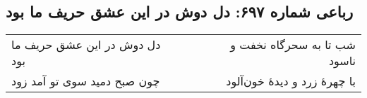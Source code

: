 \begin{center}
\section*{رباعی شماره ۶۹۷: دل دوش در این عشق حریف ما بود}
\label{sec:0697}
\begin{longtable}{l p{0.5cm} r}
دل دوش در این عشق حریف ما بود
&&
شب تا به سحرگاه نخفت و ناسود
\\
چون صبح دمید سوی تو آمد زود
&&
با چهرهٔ زرد و دیدهٔ خون‌آلود
\\
\end{longtable}
\end{center}
